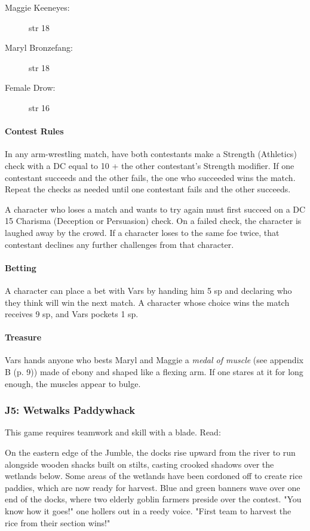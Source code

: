 \documentclass[a4paper, 11pt, bg=full, twocolumn, nooutline]{dndbook}
\begin{document}
\begin{description}
\item[Maggie Keeneyes:] str 18
\item[Maryl Bronzefang:] str 18
\item[Female Drow:] str 16
\end{description}

\paragraph{Contest Rules}

In any arm-wrestling match, have both contestants make a Strength (Athletics) check with a DC equal to 10 + the other contestant's Strength modifier. If one contestant succeeds and the other fails, the one who succeeded wins the match. Repeat the checks as needed until one contestant fails and the other succeeds.

A character who loses a match and wants to try again must first succeed on a DC 15 Charisma (Deception or Persuasion) check. On a failed check, the character is laughed away by the crowd. If a character loses to the same foe twice, that contestant declines any further challenges from that character.

\paragraph{Betting}

A character can place a bet with Vars by handing him 5 sp and declaring who they think will win the next match. A character whose choice wins the match receives 9 sp, and Vars pockets 1 sp.

\paragraph{Treasure}

Vars hands anyone who bests Maryl and Maggie a \textit{medal of muscle} (see appendix B (p. 9)) made of ebony and shaped like a flexing arm. If one stares at it for long enough, the muscles appear to bulge.

\subsubsection{J5: Wetwalks Paddywhack}

This game requires teamwork and skill with a blade. Read:

\begin{DndReadAloud}
On the eastern edge of the Jumble, the docks rise upward from the river to run alongside wooden shacks built on stilts, casting crooked shadows over the wetlands below. Some areas of the wetlands have been cordoned off to create rice paddies, which are now ready for harvest.
Blue and green banners wave over one end of the docks, where two elderly goblin farmers preside over the contest. "You know how it goes!" one hollers out in a reedy voice. "First team to harvest the rice from their section wins!"
\end{DndReadAloud}
\end{document}

